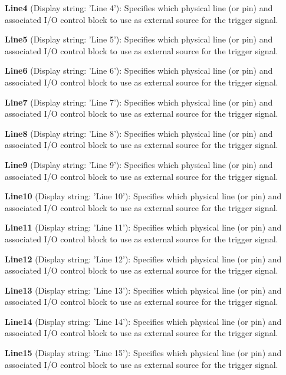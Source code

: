 \begin{DoxyItemize}
\item {\bfseries Line4} (Display string\+: 'Line 4')\+: Specifies which physical line (or pin) and associated I/\+O control block to use as external source for the trigger signal.
\item {\bfseries Line5} (Display string\+: 'Line 5')\+: Specifies which physical line (or pin) and associated I/\+O control block to use as external source for the trigger signal.
\item {\bfseries Line6} (Display string\+: 'Line 6')\+: Specifies which physical line (or pin) and associated I/\+O control block to use as external source for the trigger signal.
\item {\bfseries Line7} (Display string\+: 'Line 7')\+: Specifies which physical line (or pin) and associated I/\+O control block to use as external source for the trigger signal.
\item {\bfseries Line8} (Display string\+: 'Line 8')\+: Specifies which physical line (or pin) and associated I/\+O control block to use as external source for the trigger signal.
\item {\bfseries Line9} (Display string\+: 'Line 9')\+: Specifies which physical line (or pin) and associated I/\+O control block to use as external source for the trigger signal.
\item {\bfseries Line10} (Display string\+: 'Line 10')\+: Specifies which physical line (or pin) and associated I/\+O control block to use as external source for the trigger signal.
\item {\bfseries Line11} (Display string\+: 'Line 11')\+: Specifies which physical line (or pin) and associated I/\+O control block to use as external source for the trigger signal.
\item {\bfseries Line12} (Display string\+: 'Line 12')\+: Specifies which physical line (or pin) and associated I/\+O control block to use as external source for the trigger signal.
\item {\bfseries Line13} (Display string\+: 'Line 13')\+: Specifies which physical line (or pin) and associated I/\+O control block to use as external source for the trigger signal.
\item {\bfseries Line14} (Display string\+: 'Line 14')\+: Specifies which physical line (or pin) and associated I/\+O control block to use as external source for the trigger signal.
\item {\bfseries Line15} (Display string\+: 'Line 15')\+: Specifies which physical line (or pin) and associated I/\+O control block to use as external source for the trigger signal.

\end{DoxyItemize}
